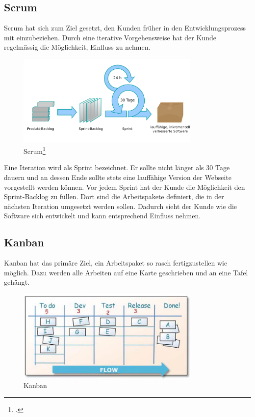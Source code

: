 \subsection{Scrum}
Scrum hat sich zum Ziel gesetzt, den Kunden früher in den Entwicklungsprozess mit einzubeziehen. 
Durch eine iterative Vorgehensweise hat der Kunde regelmässig die Möglichkeit, Einfluss zu nehmen. 

\begin{figure}[H]
  \centering
  \includegraphics[width=0.8\textwidth]{images/scrum.png}
  \caption{Scrum\footcite{Scrum_process-de_-_Scrum__Wikipedia_2015-06-03}}
  \label{fig:softwareconstruction:vorgehensmodelle:scrum}
\end{figure}

Eine Iteration wird als Sprint bezeichnet. Er sollte nicht länger als 30 Tage dauern und an dessen Ende sollte stets eine lauffähige Version der Webseite vorgestellt werden können. Vor jedem Sprint hat der Kunde die Möglichkeit den Sprint-Backlog zu füllen. Dort sind die Arbeitspakete definiert, die in der nächsten Iteration umgesetzt werden sollen. Dadurch sieht der Kunde wie die Software sich entwickelt und kann entsprechend Einfluss nehmen.

\subsection{Kanban}
Kanban hat das primäre Ziel, ein Arbeitspaket so rasch fertigzustellen wie möglich. Dazu werden alle Arbeiten auf eine Karte geschrieben und an eine Tafel gehängt.

\begin{figure}[H]
  \centering
  \includegraphics[width=0.8\textwidth]{images/kanban.png}
  \caption{Kanban}
  \label{fig:softwareconstruction:vorgehensmodelle:kanban}
\end{figure}

